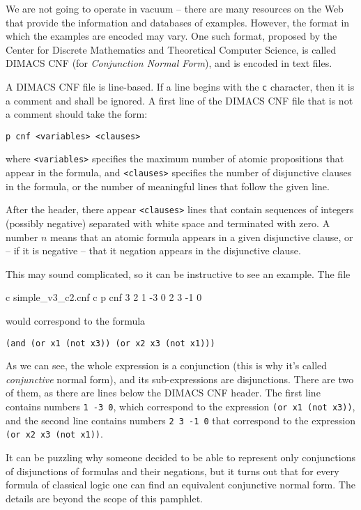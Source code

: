 We are not going to operate in vacuum -- there are many
resources on the Web that provide the information and databases
of examples. However, the format in which the examples are
encoded may vary. One such format, proposed by the Center
for Discrete Mathematics and Theoretical Computer Science,
is called DIMACS CNF (for \textit{Conjunction Normal Form}),
and is encoded in text files.

A DIMACS CNF file is line-based. If a line begins with the \texttt{c}
character, then it is a comment and shall be ignored. A first
line of the DIMACS CNF file that is not a comment should take the
form:

\texttt{p cnf <variables> <clauses>}

where \texttt{<variables>} specifies the maximum number of atomic
propositions that appear in the formula, and \texttt{<clauses>}
specifies the number of disjunctive clauses in the formula, or
the number of meaningful lines that follow the given line.

After the header, there appear \texttt{<clauses>} lines that
contain sequences of integers (possibly negative) separated with
white space and terminated with zero. A number $n$ means that
an atomic formula appears in a given disjunctive clause,
or -- if it is negative -- that it negation appears in the
disjunctive clause.

This may sound complicated, so it can be instructive to see
an example. The file

\begin{Snippet}
c simple_v3_c2.cnf
c
p cnf 3 2
1 -3 0
2 3 -1 0
\end{Snippet}

would correspond to the formula 

\texttt{(and (or x1 (not x3)) (or x2 x3 (not x1)))}

As we can see, the whole expression is a conjunction (this is
why it's called \textit{conjunctive} normal form), and its
sub-expressions are disjunctions. There are two of them,
as there are lines below the DIMACS CNF header. The first
line contains numbers \texttt{1 -3 0}, which correspond
to the expression \texttt{(or x1 (not x3))}, and the second
line contains numbers \texttt{2 3 -1 0} that correspond to
the expression \texttt{(or x2 x3 (not x1))}.

It can be puzzling why someone decided to be able to represent
only conjunctions of disjunctions of formulas and their negations,
but it turns out that for every formula of classical logic
one can find an equivalent conjunctive normal form. The details
are beyond the scope of this pamphlet.

